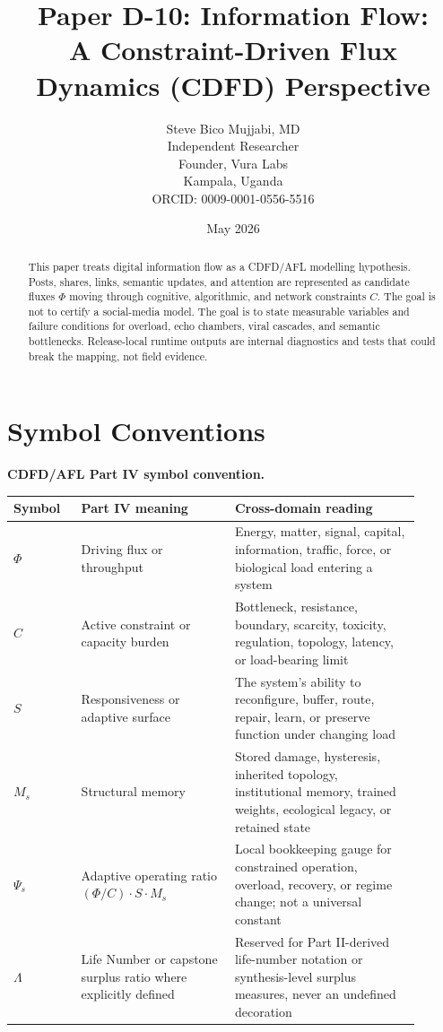 \documentclass[12pt,a4paper]{article}
\title{\textbf{Paper D-10: Information Flow:\\ A Constraint-Driven Flux Dynamics (CDFD) Perspective}}
\author{Steve Bico Mujjabi, MD\\
\small Independent Researcher\\
\small Founder, Vura Labs\\
\small Kampala, Uganda\\
\small ORCID: 0009-0001-0556-5516}
\date{May 2026}
\begin{document}
\maketitle

\begin{abstract}
This paper treats digital information flow as a CDFD/AFL modelling hypothesis.
Posts, shares, links, semantic updates, and attention are represented as
candidate fluxes $\Phi$ moving through cognitive, algorithmic, and network
constraints $C$. The goal is not to certify a social-media model. The goal is to
state measurable variables and failure conditions for overload, echo chambers,
viral cascades, and semantic bottlenecks. Release-local runtime outputs are
internal diagnostics and tests that could break the mapping, not field evidence.
\end{abstract}

\section*{Symbol Conventions}

\noindent\textbf{CDFD/AFL Part IV symbol convention.}
\begin{center}
{\small
\begin{tabular}{p{0.15\linewidth}p{0.34\linewidth}p{0.41\linewidth}}
\hline
Symbol & Part IV meaning & Cross-domain reading \\
\hline
$\Phi$ & Driving flux or throughput & Energy, matter, signal, capital, information, traffic, force, or biological load entering a system \\
$C$ & Active constraint or capacity burden & Bottleneck, resistance, boundary, scarcity, toxicity, regulation, topology, latency, or load-bearing limit \\
$S$ & Responsiveness or adaptive surface & The system's ability to reconfigure, buffer, route, repair, learn, or preserve function under changing load \\
$M_s$ & Structural memory & Stored damage, hysteresis, inherited topology, institutional memory, trained weights, ecological legacy, or retained state \\
$\Psi_s$ & Adaptive operating ratio $(\Phi/C)\cdot S\cdot M_s$ & Local bookkeeping gauge for constrained operation, overload, recovery, or regime change; not a universal constant \\
$\Lambda$ & Life Number or capstone surplus ratio where explicitly defined & Reserved for Part II-derived life-number notation or synthesis-level surplus measures, never an undefined decoration \\
\hline
\end{tabular}
}
\end{center}
\end{document}
